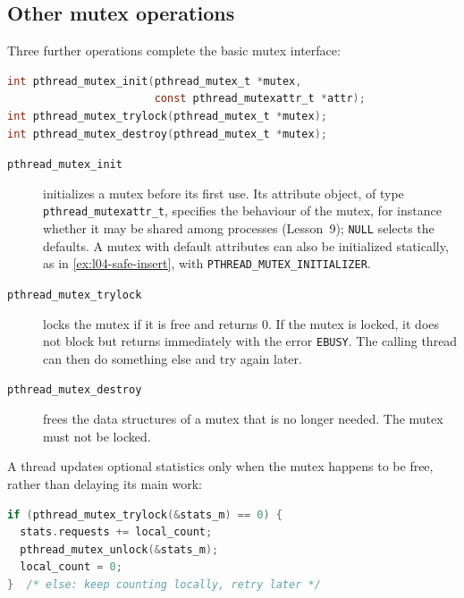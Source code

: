\documentclass[../main.tex]{subfiles}
\begin{document}
\subsection{Other mutex operations}

Three further operations complete the basic mutex interface:
\begin{lstlisting}[language=C, numbers=none]
int pthread_mutex_init(pthread_mutex_t *mutex,
                       const pthread_mutexattr_t *attr);
int pthread_mutex_trylock(pthread_mutex_t *mutex);
int pthread_mutex_destroy(pthread_mutex_t *mutex);
\end{lstlisting}
\begin{description}
  \item[\texttt{pthread\_mutex\_init}] initializes a mutex before its first
    use.  Its attribute object, of type \texttt{pthread\_mutexattr\_t},
    specifies the behaviour of the mutex, for instance whether it may be
    shared among processes (Lesson~9); \texttt{NULL} selects the
    defaults.
    A mutex with default attributes can also be initialized statically, as
    in \cref{ex:l04-safe-insert}, with \texttt{PTHREAD\_MUTEX\_INITIALIZER}.
  \item[\texttt{pthread\_mutex\_trylock}] locks the mutex if it is free and
    returns 0.  If the mutex is locked, it does not block but returns
    immediately with the error \texttt{EBUSY}.  The calling thread can then
    do something else and try again later.
  \item[\texttt{pthread\_mutex\_destroy}] frees the data structures of a
    mutex that is no longer needed.  The mutex must not be locked.
\end{description}

\begin{example}
  A thread updates optional statistics only when the mutex happens to be
  free, rather than delaying its main work:
  \begin{lstlisting}[language=C, numbers=none]
if (pthread_mutex_trylock(&stats_m) == 0) {
  stats.requests += local_count;
  pthread_mutex_unlock(&stats_m);
  local_count = 0;
}  /* else: keep counting locally, retry later */
\end{lstlisting}
\end{example}
\end{document}
